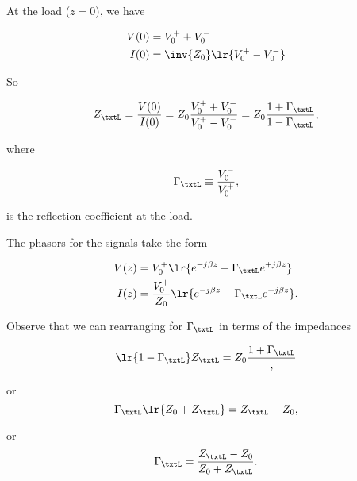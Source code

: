 At the load (\( z = 0 \)), we have

\begin{equation}\label{eqn:uwaves4TransmissionLines:860}
\begin{aligned}
V(0) &= V_0^{+} + V_0^{-} \\
I(0) &= \inv{Z_0} \lr{ V_0^{+} - V_0^{-} }
\end{aligned}
\end{equation}

So

\begin{dmath}\label{eqn:uwaves4TransmissionLines:880}
Z_\txtL 
= \frac{V(0)}{I(0)}
= Z_0 \frac{ V_0^{+} + V_0^{-} }{ V_0^{+} - V_0^{-} }
= Z_0 \frac{ 1 + \Gamma_\txtL }{1 - \Gamma_\txtL },
\end{dmath}

where

\begin{equation}\label{eqn:uwaves4TransmissionLines:900}
\Gamma_\txtL \equiv \frac{V_0^{-} }{V_0^{+}},
\end{equation}

is the reflection coefficient at the load.

The phasors for the signals take the form

\begin{equation}\label{eqn:uwaves4TransmissionLines:920}
\begin{aligned}
V(z) &= V_0^{+} \lr{ e^{-j \beta z} + \Gamma_\txtL e^{+j \beta z} } \\
I(z) &= \frac{V_0^{+}}{Z_0} \lr{ e^{-j \beta z} - \Gamma_\txtL e^{+j \beta z} }.
\end{aligned}
\end{equation}

Observe that we can rearranging for \( \Gamma_\txtL \) in terms of the impedances

\begin{dmath}\label{eqn:uwaves4TransmissionLines:940}
\lr{ 1 - \Gamma_\txtL } Z_\txtL = Z_0 \frac{ 1 + \Gamma_\txtL },
\end{dmath}

or
\begin{dmath}\label{eqn:uwaves4TransmissionLines:960}
\Gamma_\txtL \lr{ Z_0 + Z_\txtL } = Z_\txtL - Z_0,
\end{dmath}

or
\begin{dmath}\label{eqn:uwaves4TransmissionLines:980}
\Gamma_\txtL 
= \frac{Z_\txtL - Z_0}
{ Z_0 + Z_\txtL } .
\end{dmath}

